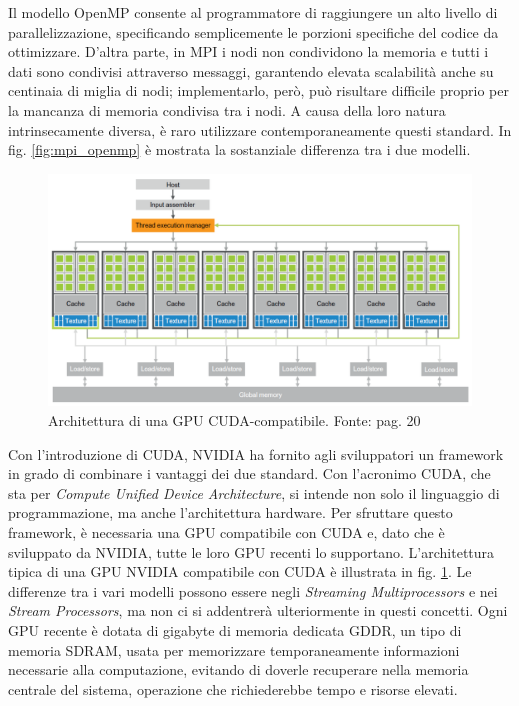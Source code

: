 Il modello OpenMP consente al programmatore di raggiungere un alto livello di parallelizzazione, specificando semplicemente le porzioni specifiche del codice da ottimizzare. D'altra parte, in MPI i nodi non condividono la memoria e tutti i dati sono condivisi attraverso messaggi, garantendo elevata scalabilità anche su centinaia di miglia di nodi; implementarlo, però, può risultare difficile proprio per la mancanza di memoria condivisa tra i nodi. A causa della loro natura intrinsecamente diversa, è raro utilizzare contemporaneamente questi standard. In fig. \ref{fig:mpi_openmp} è mostrata la sostanziale differenza tra i due modelli.

\begin{figure}[ht]
    \centering
    \includegraphics[width=.9\linewidth]{images/chapter2/cuda_arch.png}
    \caption{Architettura di una GPU CUDA-compatibile. Fonte: \cite[]{CUDA:Massive} pag. 20}
    \label{fig:cuda_arch}
\end{figure}

Con l'introduzione di \gls{CUDA}, NVIDIA ha fornito agli sviluppatori un framework in grado di combinare i vantaggi dei due standard. Con l'acronimo \gls{CUDA}, che sta per \textit{Compute Unified Device Architecture}, si intende non solo il linguaggio di programmazione, ma anche l'architettura hardware. Per sfruttare questo framework, è necessaria una \gls{GPU} compatibile con \gls{CUDA} e, dato che è sviluppato da NVIDIA, tutte le loro \gls{GPU} recenti lo supportano. L'architettura tipica di una \gls{GPU} NVIDIA compatibile con \gls{CUDA} è illustrata in fig. \ref{fig:cuda_arch}. Le differenze tra i vari modelli possono essere negli \textit{Streaming Multiprocessors} e nei \textit{Stream Processors}, ma non ci si addentrerà ulteriormente in questi concetti. Ogni \gls{GPU} recente è dotata di gigabyte di memoria dedicata \gls{GDDR}, un tipo di memoria \gls{SDRAM}, usata per memorizzare temporaneamente informazioni necessarie alla computazione, evitando di doverle recuperare nella memoria centrale del sistema, operazione che richiederebbe tempo e risorse elevati.

